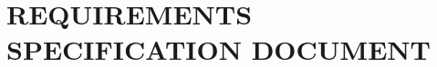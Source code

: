 \documentclass[letterpaper%
, oneside%
, 12pt%
, memoireprojet%
, english%
,creativecommons,hyperref, withAlgo2e %
]{thETS}
\begin{document}



\chapter{REQUIREMENTS SPECIFICATION DOCUMENT}











\end{document}
